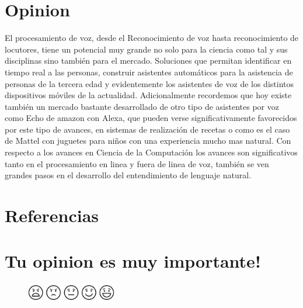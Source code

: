 \documentclass[12pt,letterpaper]{article}
\begin{document}
\section{Opinion}
El procesamiento de voz\autocite{pvoz}, desde el Reconocimiento de voz hasta reconocimiento de locutores, tiene un potencial muy grande no solo para la ciencia como tal y sus disciplinas sino también para el mercado. Soluciones que permitan identificar en tiempo real a las personas, construir asistentes automáticos para la asistencia de personas de la tercera edad y evidentemente los asistentes de voz de los distintos dispositivos móviles de la actualidad. Adicionalmente recordemos que hoy existe también un mercado bastante desarrollado de otro tipo de asistentes por voz como Echo\autocite{echo} de amazon con Alexa\autocite{alexa}, que pueden verse significativamente favorecidos por este tipo de avances, en sistemas de realización de recetas o como es el caso de Mattel con juguetes\autocite{hbarbie} para niños con una experiencia mucho mas natural.
Con respecto a los avances en Ciencia de la Computación los avances son significativos\autocite{DeVault} tanto en el procesamiento en linea y fuera de linea de voz, también se ven grandes pasos en el desarrollo del entendimiento de lenguaje natural.


\section{Referencias\label{sec:references}}

\printbibliography[heading=none]


\section{Tu opinion es muy importante!}
\begin{figure}
    \centering
    \includegraphics[width=4cm]{./images/vote.png}
    \captionsetup{justification=centering, singlelinecheck=false}
\end{figure}
\end{document}

